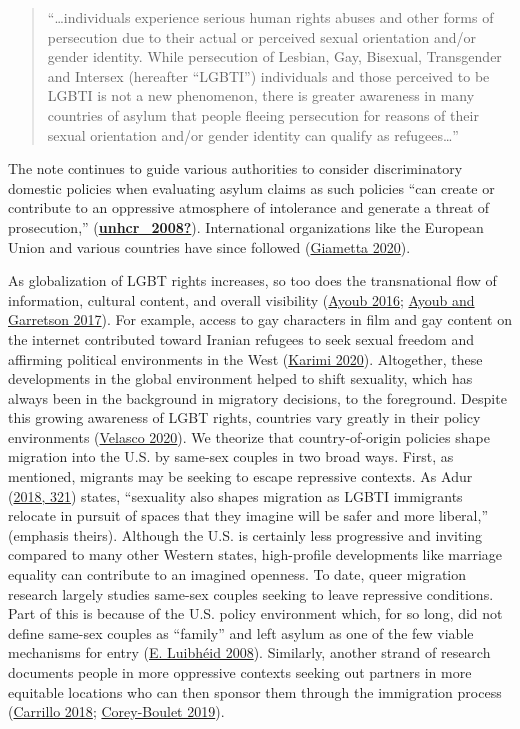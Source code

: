 \documentclass[
  11pt,
]{article}
\begin{document}
\begin{quote}
``\ldots individuals experience serious human rights abuses and other forms of persecution due to their actual or perceived sexual orientation and/or gender identity. While persecution of Lesbian, Gay, Bisexual, Transgender and Intersex (hereafter ``LGBTI'') individuals and those perceived to be LGBTI is not a new phenomenon, there is greater awareness in many countries of asylum that people fleeing persecution for reasons of their sexual orientation and/or gender identity can qualify as refugees\ldots''
\end{quote}

The note continues to guide various authorities to consider discriminatory domestic policies when evaluating asylum claims as such policies ``can create or contribute to an oppressive atmosphere of intolerance and generate a threat of prosecution,'' (\protect\hyperlink{ref-unhcr_2008}{\textbf{unhcr\_2008?}}). International organizations like the European Union and various countries have since followed (\protect\hyperlink{ref-giametta_2020}{Giametta 2020}).

As globalization of LGBT rights increases, so too does the transnational flow of information, cultural content, and overall visibility (\protect\hyperlink{ref-ayoub_2016}{Ayoub 2016}; \protect\hyperlink{ref-ayoub_2017}{Ayoub and Garretson 2017}). For example, access to gay characters in film and gay content on the internet contributed toward Iranian refugees to seek sexual freedom and affirming political environments in the West (\protect\hyperlink{ref-karimi_2020}{Karimi 2020}). Altogether, these developments in the global environment helped to shift sexuality, which has always been in the background in migratory decisions, to the foreground.
Despite this growing awareness of LGBT rights, countries vary greatly in their policy environments (\protect\hyperlink{ref-velasco_2020}{Velasco 2020}). We theorize that country-of-origin policies shape migration into the U.S. by same-sex couples in two broad ways. First, as mentioned, migrants may be seeking to escape repressive contexts. As Adur (\protect\hyperlink{ref-adur_2018}{2018, 321}) states, ``sexuality also shapes migration as LGBTI immigrants relocate in pursuit of spaces that they imagine will be safer and more liberal,'' (emphasis theirs). Although the U.S. is certainly less progressive and inviting compared to many other Western states, high-profile developments like marriage equality can contribute to an imagined openness. To date, queer migration research largely studies same-sex couples seeking to leave repressive conditions. Part of this is because of the U.S. policy environment which, for so long, did not define same-sex couples as ``family'' and left asylum as one of the few viable mechanisms for entry (\protect\hyperlink{ref-luibheid_2008}{E. Luibhéid 2008}). Similarly, another strand of research documents people in more oppressive contexts seeking out partners in more equitable locations who can then sponsor them through the immigration process (\protect\hyperlink{ref-carrillo_2018}{Carrillo 2018}; \protect\hyperlink{ref-corey-boulet_2019}{Corey-Boulet 2019}).
\end{document}
